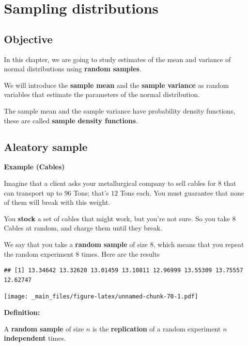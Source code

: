 \documentclass[
]{book}
\begin{document}
\hypertarget{sampling-distributions}{%
\chapter{Sampling distributions}\label{sampling-distributions}}

\hypertarget{objective-5}{%
\section{Objective}\label{objective-5}}

In this chapter, we are going to study estimates of the mean and variance of normal distributions using \textbf{random samples}.

We will introduce the \textbf{sample mean} and the \textbf{sample variance} as random variables that estimate the parameters of the normal distribution.

The sample mean and the sample variance have probability density functions, these are called \textbf{sample density functions}.

\hypertarget{aleatory-sample}{%
\section{Aleatory sample}\label{aleatory-sample}}

\textbf{Example (Cables)}

Imagine that a client asks your metallurgical company to sell cables for \(8\) that can transport up to \(96\) Tons; that's \(12\) Tons each. You must guarantee that none of them will break with this weight.

You \textbf{stock} a set of cables that might work, but you're not sure. So you take \(8\) Cables at random, and charge them until they break.

We say that you take a \textbf{random sample} of size \(8\), which means that you repeat the random experiment \(8\) times. Here are the results

\begin{verbatim}
## [1] 13.34642 13.32620 13.01459 13.10811 12.96999 13.55309 13.75557 12.62747
\end{verbatim}

\texttt{[image: \_main\_files/figure-latex/unnamed-chunk-70-1.pdf]}

\textbf{Definition:}

A \textbf{random sample} of size \(n\) is the \textbf{replication} of a random experiment \(n\) \textbf{independent} times.
\end{document}
